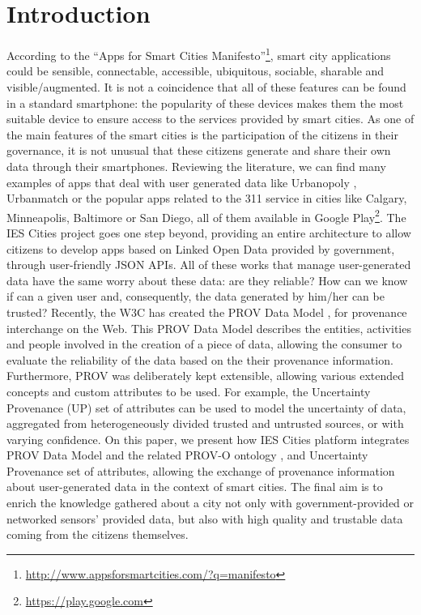\section{Introduction}
\label{sec:introduction}

According to the ``Apps for Smart Cities Manifesto''\footnote{\url{http://www.appsforsmartcities.com/?q=manifesto}}, smart city applications could be sensible, connectable, accessible, ubiquitous, sociable, sharable and visible/augmented. It is not a coincidence that all of these features can be found in a standard smartphone: the popularity of these devices makes them the most suitable device to ensure access to the services provided by smart cities. As one of the main features of the smart cities is the participation of the citizens in their governance, it is not unusual that these citizens generate and share their own data through their smartphones. Reviewing the literature, we can find many examples of apps that deal with user generated data like Urbanopoly \cite{celino_urbanopoly_2012}, Urbanmatch \cite{celino_urbanmatch_2012} or the popular apps related to the 311 service in cities like Calgary, Minneapolis, Baltimore or San Diego, all of them available in Google Play\footnote{\url{https://play.google.com}}. The IES Cities project goes one step beyond, providing an entire architecture to allow citizens to develop apps based on Linked Open Data \cite{bizer_linked_2009} provided by government, through user-friendly JSON APIs. All of these works that manage user-generated data have the same worry about these data: are they reliable? How can we know if can a given user and, consequently, the data generated by him/her can be trusted? Recently, the W3C has created the PROV Data Model \cite{moreau_prov-dm:_2012}, for provenance interchange on the Web. This PROV Data Model describes the entities, activities and people involved in the creation of a piece of data, allowing the consumer to evaluate the reliability of the data based on the their provenance information. Furthermore, PROV was deliberately kept extensible, allowing various extended concepts and custom attributes to be used. For example, the Uncertainty Provenance (UP) \cite{de_nies_modeling_2013} set of attributes can be used to model the uncertainty of data, aggregated from heterogeneously divided trusted and untrusted sources, or with varying confidence. On this paper, we present how IES Cities platform integrates PROV Data Model and the related PROV-O ontology \cite{lebo_prov-o:_2013}, and Uncertainty Provenance set of attributes, allowing the exchange of provenance information about user-generated data in the context of smart cities. The final aim is to enrich the knowledge gathered about a city not only with government-provided or networked sensors’ provided data, but also with high quality and trustable data coming from the citizens themselves.

